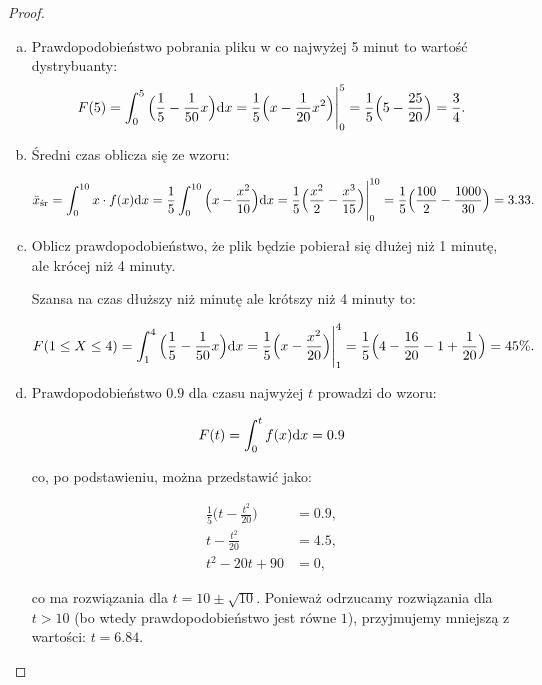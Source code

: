 \documentclass[11pt]{article}
\theoremstyle{definition}
\numberwithin{zadanie}{section}
\begin{document}
\begin{proof}

    \begin{enumerate}[a)]
        \item Prawdopodobieństwo pobrania pliku w co najwyżej 5 minut to wartość dystrybuanty:
              $$F(5)=\int_0^5\Big(\frac15-\frac1{50}x\Big)\text dx = \frac15\Big(x-\frac1{20}x^2\Big)\Bigg|_0^5=\frac15\Big(5-\frac{25}{20}\Big)=\frac34.$$
        \item Średni czas oblicza się ze wzoru:

              $$\bar x_{\text{śr}}=\int_0^{10}x\cdot f(x)\text dx = \frac15\int_0^{10}\Big(x-\frac{x^2}{10}\Big)\text dx = \frac15\Big(\frac{x^2}{2}-\frac{x^3}{15}\Big)\Bigg|_0^{10} = \frac{1}{5}\Big(\frac{100}{2}-\frac{1000}{30}\Big) = 3.33.$$

        \item Oblicz prawdopodobieństwo, że plik będzie pobierał się dłużej niż 1 minutę, ale krócej niż 4 minuty.

              Szansa na czas dłuższy niż minutę ale krótszy niż 4 minuty to:

              $$F(1\leq X\leq 4) = \int_1^4\Big(\frac15-\frac1{50}x\Big)\text dx = \frac15\Big(x-\frac{x^2}{20}\Big)\Bigg|_1^4 = \frac15\Big(4-\frac{16}{20}-1+\frac{1}{20}\Big)=45\%.$$

        \item Prawdopodobieństwo $0.9$ dla czasu najwyżej $t$ prowadzi do wzoru:

              $$F(t) = \int_0^tf(x)\text dx = 0.9$$

              co, po podstawieniu, można przedstawić jako:

              \begin{align*}
                  \frac15\Big(t-\frac{t^2}{20}\Big) & = 0.9, \\
                  t-\frac{t^2}{20}                  & = 4.5, \\
                  t^2 - 20t + 90                    & =0,
              \end{align*}

              co ma rozwiązania dla $t=10\pm\sqrt{10}$. Ponieważ odrzucamy rozwiązania dla $t>10$ (bo wtedy prawdopodobieństwo jest równe $1$), przyjmujemy mniejszą z wartości: $t=6.84$.


    \end{enumerate}
\end{proof}
\end{document}

